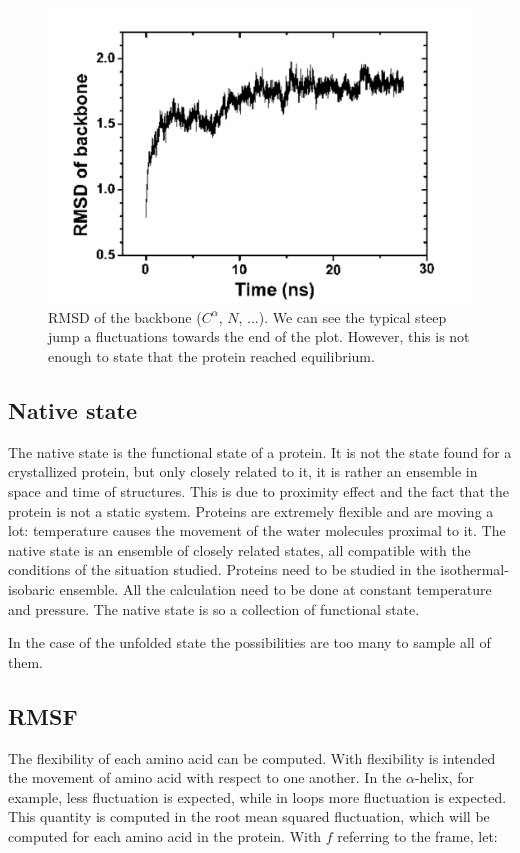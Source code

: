 		\begin{figure}[H]
			\centering
			\includegraphics[scale = 0.3]{rmsd.png}
			\caption{RMSD of the backbone ($C^{\alpha}$, $N$, ...). We can see the typical steep jump a fluctuations towards the end of the plot. However, this is not enough to state that the protein reached equilibrium.}
			\label{fig:rmsd}
			\end{figure}


	\subsection{Native state}
	The native state is the functional state of a protein.
	It is not the state found for a crystallized protein, but only closely related to it, it is rather an ensemble in space and time of structures.
	This is due to proximity effect and the fact that the protein is not a static system.
	Proteins are extremely flexible and are moving a lot: temperature causes the movement of the water molecules proximal to it.
	The native state is an ensemble of closely related states, all compatible with the conditions of the situation studied.
	Proteins need to be studied in the isothermal-isobaric ensemble.
	All the calculation need to be done at constant temperature and pressure.
	The native state is so a collection of functional state.

	In the case of the unfolded state the possibilities are too many to sample all of them.

	\subsection{RMSF}
	The flexibility of each amino acid can be computed.
	With flexibility is intended the movement of amino acid with respect to one another.
	In the $\alpha$-helix, for example, less fluctuation is expected, while in loops more fluctuation is expected.
	This quantity is computed in the root mean squared fluctuation, which will be computed for each amino acid in the protein.
	With $f$ referring to the frame, let:

